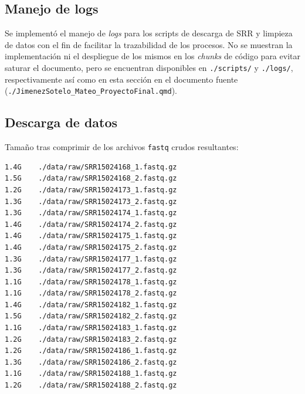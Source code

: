 \documentclass[
  12pt,
  letterpaper,
  DIV=11,
  numbers=noendperiod]{scrartcl}
\begin{document}
\begin{table}[H]

\caption{\label{tbl-old-samples}Tabla de muestras del grupo de edad
adulto (12-16 años) antes de la selección final. Se muestran las 5
muestras filtradas, ordenadas por edad y con información relevante para
la selección final.}


\end{table}%

\subsection{Manejo de logs}\label{manejo-de-logs}

Se implementó el manejo de \emph{logs} para los scripts de descarga de
SRR y limpieza de datos con el fin de facilitar la trazabilidad de los
procesos. No se muestran la implementación ni el despliegue de los
mismos en los \emph{chunks} de código para evitar saturar el documento,
pero se encuentran disponibles en \texttt{./scripts/} y
\texttt{./logs/}, respectivamente así como en esta sección en el
documento fuente (\texttt{./JimenezSotelo\_Mateo\_ProyectoFinal.qmd}).

\subsection{Descarga de datos}\label{descarga-de-datos-1}

Tamaño tras comprimir de los archivos \texttt{fastq} crudos resultantes:

\begin{verbatim}
1.4G    ./data/raw/SRR15024168_1.fastq.gz
1.5G    ./data/raw/SRR15024168_2.fastq.gz
1.2G    ./data/raw/SRR15024173_1.fastq.gz
1.3G    ./data/raw/SRR15024173_2.fastq.gz
1.3G    ./data/raw/SRR15024174_1.fastq.gz
1.4G    ./data/raw/SRR15024174_2.fastq.gz
1.4G    ./data/raw/SRR15024175_1.fastq.gz
1.4G    ./data/raw/SRR15024175_2.fastq.gz
1.3G    ./data/raw/SRR15024177_1.fastq.gz
1.3G    ./data/raw/SRR15024177_2.fastq.gz
1.1G    ./data/raw/SRR15024178_1.fastq.gz
1.1G    ./data/raw/SRR15024178_2.fastq.gz
1.4G    ./data/raw/SRR15024182_1.fastq.gz
1.5G    ./data/raw/SRR15024182_2.fastq.gz
1.1G    ./data/raw/SRR15024183_1.fastq.gz
1.2G    ./data/raw/SRR15024183_2.fastq.gz
1.2G    ./data/raw/SRR15024186_1.fastq.gz
1.3G    ./data/raw/SRR15024186_2.fastq.gz
1.1G    ./data/raw/SRR15024188_1.fastq.gz
1.2G    ./data/raw/SRR15024188_2.fastq.gz
\end{verbatim}
\end{document}
